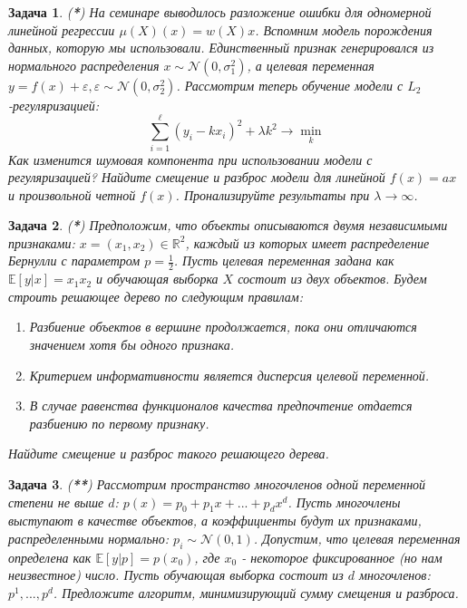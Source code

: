 \documentclass[12pt,fleqn]{article}
\newtheorem{esProblem}{Задача}
\begin{document}
\begin{esProblem}
    (\textbf{*}) На семинаре выводилось разложение ошибки для одномерной линейной регрессии $\mu(X)(x) = w(X)x$. Вспомним модель порождения данных, которую мы использовали. Единственный признак генерировался из нормального распределения $x \sim \mathcal{N}(0, \sigma_1^2)$, а целевая переменная $y = f(x) + \varepsilon, \varepsilon \sim \mathcal{N}(0, \sigma_2^2)$. Рассмотрим теперь обучение модели с $L_2$-регуляризацией: 
    $$
    \sum_{i=1}^{\ell} (y_i - k x_i)^2 + \lambda k^2 \rightarrow \displaystyle\min_k
    $$
    Как изменится шумовая компонента при использовании модели с регуляризацией? Найдите смещение и разброс модели для линейной $f(x) = ax$ и произвольной четной $f(x)$. Пронализируйте результаты при $\lambda \rightarrow \infty$.
\end{esProblem}

\begin{esProblem}
    (\textbf{*}) Предположим, что объекты описываются двумя независимыми признаками: $x=(x_1, x_2) \in \mathbb{R}^2$, каждый из которых имеет распределение Бернулли с параметром $p=\frac{1}{2}$. Пусть целевая переменная задана как $\mathbb{E}[y|x] = x_1 x_2$ и обучающая выборка $X$ состоит из двух объектов. Будем строить решающее дерево по следующим правилам:
    
    \begin{enumerate}
        \item Разбиение объектов в вершине продолжается, пока они отличаются значением хотя бы одного признака.
        \item Критерием информативности является дисперсия целевой переменной.
        \item В случае равенства функционалов качества предпочтение отдается разбиению по первому признаку.
    \end{enumerate}
    
    \noindent
    Найдите смещение и разброс такого решающего дерева.
\end{esProblem}

\begin{esProblem}
    (\textbf{**}) Рассмотрим пространство многочленов одной переменной степени не выше $d$: $p(x) = p_0 + p_1 x + ... + p_d x^d$. Пусть многочлены выступают в качестве объектов, а коэффициенты будут их признаками, распределенными нормально: $p_i \sim \mathcal{N}(0, 1)$. Допустим, что целевая переменная определена как $\mathbb{E}[y|p] = p(x_0)$, где $x_0$ - некоторое фиксированное (но нам неизвестное) число. Пусть обучающая выборка состоит из $d$ многочленов: $p^1, ..., p^d$. Предложите алгоритм, минимизирующий сумму смещения и разброса.
\end{esProblem}
\end{document}
